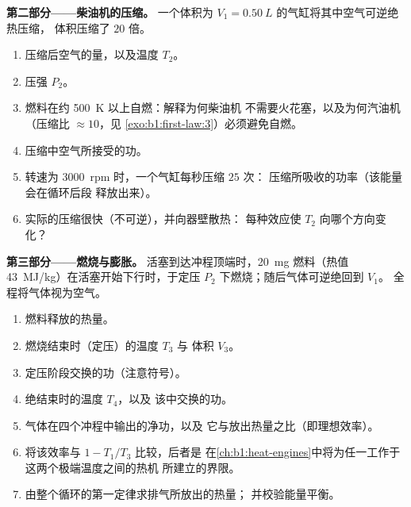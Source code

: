 \begin{problem}
\medskip
\noindent\textbf{第二部分——柴油机的压缩。}
一个体积为 $V_1 = \qty{0.50}{L}$ 的气缸将其中空气可逆绝热压缩，
体积压缩了 $20$ 倍。
\begin{enumerate}[resume]
  \item 压缩后空气的量，以及温度 $T_2$。
  \item 压强 $P_2$。
  \item 燃料在约 \qty{500}{K} 以上自燃：解释为何柴油机
        不需要火花塞，以及为何汽油机（压缩比
        $\approx 10$，见 \cref{exo:b1:first-law:3}）必须避免自燃。
  \item 压缩中空气所接受的功。
  \item 转速为 \qty{3000}{rpm} 时，一个气缸每秒压缩 $25$ 次：
        压缩所吸收的功率（该能量会在循环后段
        释放出来）。
  \item 实际的压缩很快（不可逆），并向器壁散热：
        每种效应使 $T_2$ 向哪个方向变化？
\end{enumerate}

\medskip
\noindent\textbf{第三部分——燃烧与膨胀。}
活塞到达冲程顶端时，\qty{20}{mg} 燃料（热值
\qty{43}{MJ/kg}）在活塞开始下行时，于定压
$P_2$ 下燃烧；随后气体可逆绝回到 $V_1$。
全程将气体视为空气。
\begin{enumerate}[resume]
  \item 燃料释放的热量。
  \item 燃烧结束时（定压）的温度 $T_3$ 与
        体积 $V_3$。
  \item 定压阶段交换的功（注意符号）。
  \item 绝结束时的温度 $T_4$，以及
        该中交换的功。
  \item 气体在四个冲程中输出的净功，以及
        它与放出热量之比（即理想效率）。
  \item 将该效率与 $1 - T_1/T_3$ 比较，后者是
        在\cref{ch:b1:heat-engines}中将为任一工作于这两个极端温度之间的热机
        所建立的界限。
  \item 由整个循环的第一定律求排气所放出的热量；
        并校验能量平衡。
\end{enumerate}


\end{problem}
